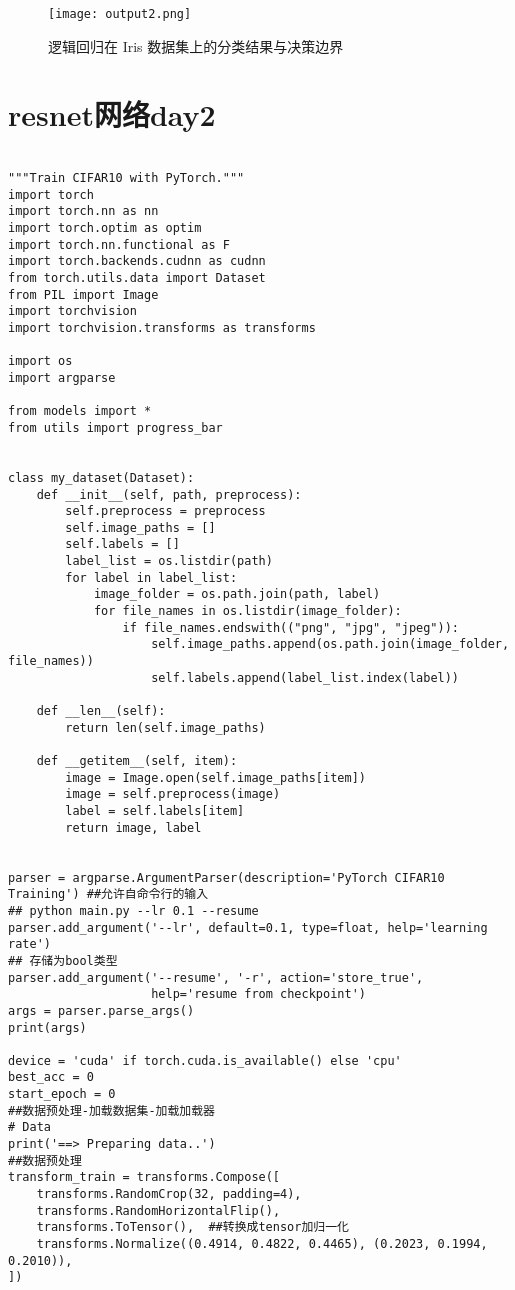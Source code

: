 \documentclass{article}
\begin{document}
\begin{figure}[htbp]
    \centering
    \texttt{[image: output2.png]}
    \caption{逻辑回归在 Iris 数据集上的分类结果与决策边界}
    \label{fig:logistic-iris}
\end{figure}



\section{resnet网络day2}

\begin{lstlisting}

"""Train CIFAR10 with PyTorch."""
import torch
import torch.nn as nn
import torch.optim as optim
import torch.nn.functional as F
import torch.backends.cudnn as cudnn
from torch.utils.data import Dataset
from PIL import Image
import torchvision
import torchvision.transforms as transforms

import os
import argparse

from models import *
from utils import progress_bar


class my_dataset(Dataset):
    def __init__(self, path, preprocess):
        self.preprocess = preprocess
        self.image_paths = []
        self.labels = []
        label_list = os.listdir(path)
        for label in label_list:
            image_folder = os.path.join(path, label)
            for file_names in os.listdir(image_folder):
                if file_names.endswith(("png", "jpg", "jpeg")):
                    self.image_paths.append(os.path.join(image_folder, file_names))
                    self.labels.append(label_list.index(label))

    def __len__(self):
        return len(self.image_paths)

    def __getitem__(self, item):
        image = Image.open(self.image_paths[item])
        image = self.preprocess(image)
        label = self.labels[item]
        return image, label


parser = argparse.ArgumentParser(description='PyTorch CIFAR10 Training') ##允许自命令行的输入
## python main.py --lr 0.1 --resume
parser.add_argument('--lr', default=0.1, type=float, help='learning rate')
## 存储为bool类型
parser.add_argument('--resume', '-r', action='store_true',
                    help='resume from checkpoint')
args = parser.parse_args()
print(args)

device = 'cuda' if torch.cuda.is_available() else 'cpu'
best_acc = 0  
start_epoch = 0 
##数据预处理-加载数据集-加载加载器
# Data
print('==> Preparing data..')
##数据预处理
transform_train = transforms.Compose([
    transforms.RandomCrop(32, padding=4),
    transforms.RandomHorizontalFlip(),
    transforms.ToTensor(),  ##转换成tensor加归一化
    transforms.Normalize((0.4914, 0.4822, 0.4465), (0.2023, 0.1994, 0.2010)),
])


\end{lstlisting}
\end{document}
